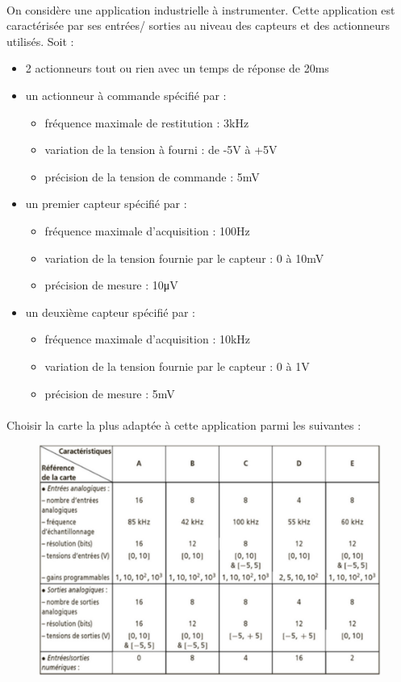 \documentclass{article}
\begin{document}
\paragraph{}
On considère une application industrielle à instrumenter. Cette application est caractérisée par ses entrées/ sorties au niveau des capteurs et des actionneurs utilisés. Soit :
\begin{itemize}
    \item 2 actionneurs tout ou rien avec un temps de réponse de 20ms
    \item un actionneur à commande spécifié par :
    \begin{itemize}
        \item fréquence maximale de restitution : 3kHz
        \item variation de la tension à fourni : de -5V à +5V
        \item précision de la tension de commande : 5mV
    \end{itemize}
    \item un premier capteur spécifié par :
    \begin{itemize}
        \item fréquence maximale d'acquisition : 100Hz
        \item variation de la tension fournie par le capteur : 0 à 10mV
        \item précision de mesure : 10\si{\micro\volt}
    \end{itemize}
    \item un deuxième capteur spécifié par :
    \begin{itemize}
        \item fréquence maximale d'acquisition : 10kHz
        \item variation de la tension fournie par le capteur : 0 à 1V
        \item précision de mesure : 5mV
    \end{itemize}
\end{itemize}

\paragraph{}
Choisir la carte la plus adaptée à cette application parmi les suivantes :
\begin{figure}[H]
    \centering
    \includegraphics[width=.75\linewidth]{images/choix-carte.jpg}
\end{figure}
\end{document}
